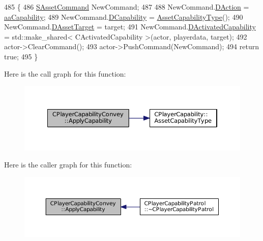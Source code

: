 \begin{DoxyCode}
485                                                                                                            
                                                          \{
486     \hyperlink{structSAssetCommand}{SAssetCommand} NewCommand;
487     
488     NewCommand.\hyperlink{structSAssetCommand_a8edd3b3d59a76d5514ba403bc8076a75}{DAction} = \hyperlink{GameDataTypes_8h_ab47668e651a3032cfb9c40ea2d60d670acf9fb164e8abd71c71f4a8c7fda360d4}{aaCapability};
489     NewCommand.\hyperlink{structSAssetCommand_a734ea7c6847457b437360f333f570ff9}{DCapability} = \hyperlink{classCPlayerCapability_a433bb196cd6ab6a932f1cac102b3aa98}{AssetCapabilityType}();
490     NewCommand.\hyperlink{structSAssetCommand_a3d9b43f6e59c386c48c41a65448a0c39}{DAssetTarget} = target;
491     NewCommand.\hyperlink{structSAssetCommand_ad8beda19520811cc70fe1eab16c774dd}{DActivatedCapability} = std::make\_shared< CActivatedCapability >(actor, 
      playerdata, target);
492     actor->ClearCommand();
493     actor->PushCommand(NewCommand);
494     \textcolor{keywordflow}{return} \textcolor{keyword}{true};
495 \}
\end{DoxyCode}
Here is the call graph for this function\+:\nopagebreak
\begin{figure}[H]
\begin{center}
\leavevmode
\includegraphics[width=350pt]{classCPlayerCapabilityConvey_ad05e5ab950872e685fb9449592f7f5a9_cgraph}
\end{center}
\end{figure}
Here is the caller graph for this function\+:\nopagebreak
\begin{figure}[H]
\begin{center}
\leavevmode
\includegraphics[width=350pt]{classCPlayerCapabilityConvey_ad05e5ab950872e685fb9449592f7f5a9_icgraph}
\end{center}
\end{figure}
\hypertarget{classCPlayerCapabilityConvey_a795b3eb4c3879a6d7da1cba7962a1c78}{}\label{classCPlayerCapabilityConvey_a795b3eb4c3879a6d7da1cba7962a1c78} 
